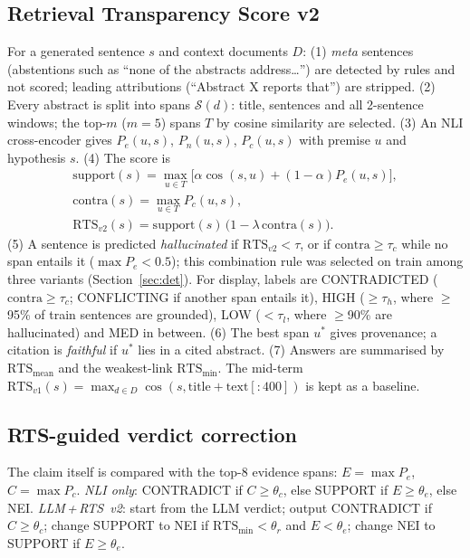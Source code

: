 \documentclass[conference]{IEEEtran}
\newcommand{\RTS}{\mathrm{RTS}}
\begin{document}
\subsection{Retrieval Transparency Score v2}
For a generated sentence $s$ and context documents $D$: (1) \emph{meta} sentences (abstentions such as ``none of the
abstracts address\ldots'') are detected by rules and not scored; leading attributions (``Abstract X reports that'') are
stripped. (2) Every abstract is split into spans $\mathcal{S}(d)$: title, sentences and all 2-sentence windows; the top-$m$
($m{=}5$) spans $T$ by cosine similarity are selected. (3) An NLI cross-encoder gives $P_e(u,s)$, $P_n(u,s)$, $P_c(u,s)$ with
premise $u$ and hypothesis $s$. (4) The score is
\begin{gather}
\mathrm{support}(s)=\max_{u\in T}\big[\alpha\cos(s,u)+(1-\alpha)P_e(u,s)\big],\\
\mathrm{contra}(s)=\max_{u\in T}P_c(u,s),\\
\RTS_{v2}(s)=\mathrm{support}(s)\,\big(1-\lambda\,\mathrm{contra}(s)\big).
\end{gather}
(5) A sentence is predicted \emph{hallucinated} if $\RTS_{v2}<\tau$, or if $\mathrm{contra}\ge\tau_c$ while no span
entails it ($\max P_e<0.5$); this combination rule was selected on train among three variants (Section~\ref{sec:det}). For display,
labels are CONTRADICTED ($\mathrm{contra}\ge\tau_c$; CONFLICTING if another span entails it), HIGH ($\ge\tau_h$, where
$\geq$95\% of train sentences are grounded), LOW ($<\tau_l$, where $\geq$90\% are hallucinated) and MED in between.
(6) The best span $u^\ast$ gives provenance; a citation is \emph{faithful} if $u^\ast$ lies in a cited abstract.
(7) Answers are summarised by $\RTS_{\text{mean}}$ and the weakest-link $\RTS_{\min}$. The mid-term
$\RTS_{v1}(s)=\max_{d\in D}\cos(s,\text{title}+\text{text}[{:}400])$ is kept as a baseline.

\subsection{RTS-guided verdict correction}
The claim itself is compared with the top-8 evidence spans: $E=\max P_e$, $C=\max P_c$. \emph{NLI only}: CONTRADICT if
$C\ge\theta_c$, else SUPPORT if $E\ge\theta_e$, else NEI. \emph{LLM\,+\,RTS~v2}: start from the LLM verdict; output
CONTRADICT if $C\ge\theta_c$; change SUPPORT to NEI if $\RTS_{\min}<\theta_r$ and $E<\theta_e$; change NEI to SUPPORT if
$E\ge\theta_e$.
\end{document}
